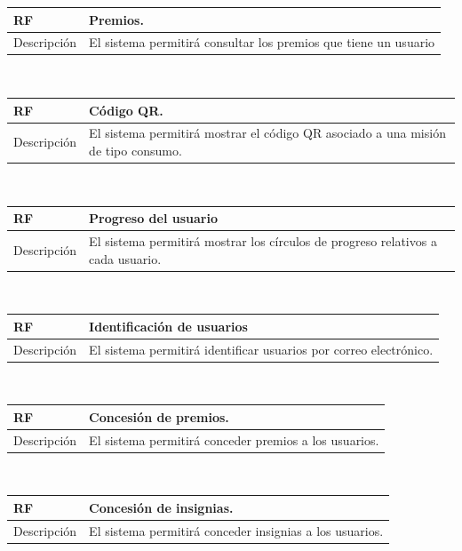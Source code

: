 \documentclass[twoside]{report}
\newcommand\addrow[2]{#1 &#2\\ }
\newcommand\addheading[2]{#1 &#2\\ \hline}
\newcommand\tabularhead{\begin{tabular}{lp{0.7\textwidth}}
\hline
}
\newenvironment{req}{\tabularhead}
{\hline\end{tabular}}
\begin{document}
\vspace{0.25cm}

\begin{req}
	\addheading{\textbf{RF\arabic{functionalRequirements}}}{Premios.}
	\addrow{Descripción}{El sistema permitirá consultar los premios que tiene un usuario}
\end{req}\\

\vspace{0.25cm}

\begin{req}
	\addheading{\textbf{RF\arabic{functionalRequirements}}}{Código QR.}
	\addrow{Descripción}{El sistema permitirá mostrar el código QR asociado a una misión de tipo consumo.}
\end{req}\\

\vspace{0.25cm}

\begin{req}
	\addheading{\textbf{RF\arabic{functionalRequirements}}}{Progreso del usuario}
	\addrow{Descripción}{El sistema permitirá mostrar los círculos de progreso relativos a cada usuario.}
\end{req}\\

\vspace{0.25cm}

\begin{req}
	\addheading{\textbf{RF\arabic{functionalRequirements}}}{Identificación de usuarios}
	\addrow{Descripción}{El sistema permitirá identificar usuarios por correo electrónico.}
\end{req}\\

\vspace{0.25cm}

\begin{req}
	\addheading{\textbf{RF\arabic{functionalRequirements}}}{Concesión de premios.}
	\addrow{Descripción}{El sistema permitirá conceder premios a los usuarios.}
\end{req}\\

\vspace{0.25cm}

\begin{req}
	\addheading{\textbf{RF\arabic{functionalRequirements}}}{Concesión de insignias.}
	\addrow{Descripción}{El sistema permitirá conceder insignias a los usuarios.}
\end{req}\\
\end{document}
